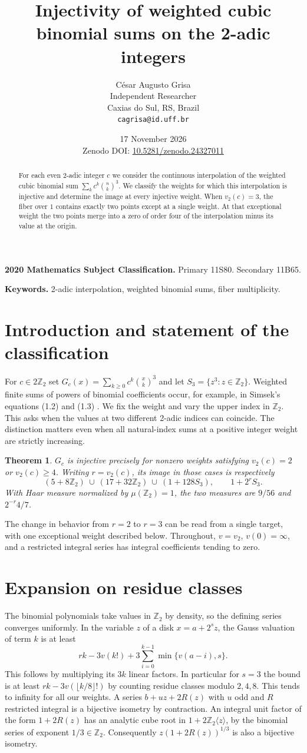 \documentclass[11pt]{article}
\title{Injectivity of weighted cubic binomial sums on the 2-adic integers}
\author{C\'esar Augusto Grisa\\{\small Independent Researcher}\\
{\small Caxias do Sul, RS, Brazil}\\
{\small\texttt{cagrisa@id.uff.br}}}
\date{17 November 2026\\[0.4em]{\small Zenodo DOI: \href{https://doi.org/10.5281/zenodo.24327011}{10.5281/zenodo.24327011}}}
\newtheorem{theorem}{Theorem}
\newcommand{\Z}{\mathbb Z_2}
\newcommand{\R}{\mathbb Z_2\langle z\rangle}
\begin{document}
\maketitle
\begin{abstract}
For each even 2-adic integer $c$ we consider the continuous interpolation of the weighted cubic binomial sum $\sum_k c^k\binom{n}{k}^3$. We classify the weights for which this interpolation is injective and determine the image at every injective weight. When $v_2(c)=3$, the fiber over $1$ contains exactly two points except at a single weight. At that exceptional weight the two points merge into a zero of order four of the interpolation minus its value at the origin.
\end{abstract}

\noindent\textbf{2020 Mathematics Subject Classification.} Primary 11S80. Secondary 11B65.
\par\noindent\textbf{Keywords.} 2-adic interpolation, weighted binomial sums, fiber multiplicity.
\section{Introduction and statement of the classification}
For $c\in2\Z$ set $G_c(x)=\sum_{k\ge0}c^k\binom{x}{k}^3$ and let $S_3=\{z^3:z\in\Z\}$. Weighted finite sums of powers of binomial coefficients occur, for example, in Simsek's equations (1.2) and (1.3) \cite{simsek}. We fix the weight and vary the upper index in $\Z$. This asks when the values at two different 2-adic indices can coincide. The distinction matters even when all natural-index sums at a positive integer weight are strictly increasing.
\begin{theorem}
$G_c$ is injective precisely for nonzero weights satisfying $v_2(c)=2$ or $v_2(c)\ge4$. Writing $r=v_2(c)$, its image in those cases is respectively
\[
 (5+8\Z)\ \cup\ (17+32\Z)\ \cup\ (1+128S_3),
 \qquad 1+2^rS_3 .
\]
With Haar measure normalized by $\mu(\Z)=1$, the two measures are $9/56$ and $2^{-r}4/7$.
\end{theorem}
The change in behavior from $r=2$ to $r=3$ can be read from a single target, with one exceptional weight described below. Throughout, $v=v_2$, $v(0)=\infty$, and a restricted integral series has integral coefficients tending to zero.
\section{Expansion on residue classes}
The binomial polynomials take values in $\Z$ by density, so the defining series converges uniformly. In the variable $z$ of a disk $x=a+2^s z$, the Gauss valuation of term $k$ is at least
\[
 rk-3v(k!)+3\sum_{i=0}^{k-1}\min\{v(a-i),s\}.
\tag{1}
\]
This follows by multiplying its $3k$ linear factors. In particular for $s=3$ the bound is at least $rk-3v(\lfloor k/8\rfloor!)$ by counting residue classes modulo $2,4,8$. This tends to infinity for all our weights. A series $b+uz+2R(z)$ with $u$ odd and $R$ restricted integral is a bijective isometry by contraction. An integral unit factor of the form $1+2R(z)$ has an analytic cube root in $1+2\R$, by the binomial series of exponent $1/3\in\Z$. Consequently $z(1+2R(z))^{1/3}$ is also a bijective isometry.
\end{document}
